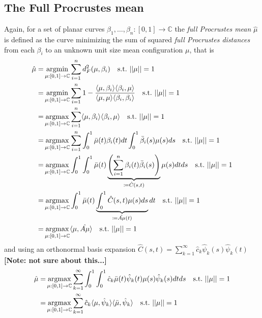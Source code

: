 \subsection{The Full Procrustes mean}
Again, for a set of planar curves $\beta_1,\dots,\beta_n : [0,1] \rightarrow \mathbb{C}$ the \textit{full Procrustes mean} $\hat{\mu}$ is defined as the curve minimizing the sum of squared \textit{full Procrustes distances} from each $\beta_i$ to an unknown unit size mean configuration $\mu$, that is
\begin{align*}
  \hat{\mu} =& \operatorname*{argmin}_{\mu:[0,1]\rightarrow\mathbb{C}} \sum_{i=1}^n d^2_F(\mu,\beta_i) 
    \quad\text{s.t.}\,\, ||\mu|| = 1 \\
  =& \operatorname*{argmin}_{\mu:[0,1]\rightarrow\mathbb{C}} \sum_{i=1}^n 1 - \frac{\langle \mu, \beta_i \rangle \langle \beta_i, \mu \rangle}{\langle \mu, \mu \rangle \langle \beta_i, \beta_i \rangle}
    \quad\text{s.t.}\,\, ||\mu|| = 1 \\
  =& \operatorname*{argmax}_{\mu:[0,1]\rightarrow\mathbb{C}} \sum_{i=1}^n \langle \mu, \beta_i \rangle \langle \beta_i, \mu \rangle
    \quad\text{s.t.}\,\, ||\mu|| = 1 \\
  =& \operatorname*{argmax}_{\mu:[0,1]\rightarrow\mathbb{C}} \sum_{i=1}^n 
    \int_0^1 \bar\mu(t) \beta_i(t) dt \int_0^1 \bar\beta_i(s) \mu(s) ds
    \quad\text{s.t.}\,\, ||\mu|| = 1 \\
  =& \operatorname*{argmax}_{\mu:[0,1]\rightarrow\mathbb{C}}  \int_0^1 \int_0^1 
    \bar\mu(t) \underbrace{\left( \sum_{i=1}^n \beta_i(t) \bar\beta_i(s) \right)}_{\coloneqq \hat{C}(s,t)} \mu(s) dt ds
    \quad\text{s.t.}\,\, ||\mu|| = 1 \\
  =& \operatorname*{argmax}_{\mu:[0,1]\rightarrow\mathbb{C}} \int_0^1 \bar\mu(t)
  \underbrace{\int_0^1 \hat{C}(s,t) \mu(s) ds}_{\coloneqq \hat{A\mu}(t)} dt
    \quad\text{s.t.}\,\, ||\mu|| = 1 \\
  =& \operatorname*{argmax}_{\mu:[0,1]\rightarrow\mathbb{C}}
    \langle \mu, \hat{A\mu} \rangle
    \quad\text{s.t.}\,\, ||\mu|| = 1 \\
\end{align*}
and using an orthonormal basis expansion $\hat{C}(s,t) = \sum_{k=1}^\infty \hat{c}_k \hat{\psi}_k(s) \hat{\psi}_k(t)$ \textbf{[Note: not sure about this...]}
\begin{align*}
  \hat{\mu}=& \operatorname*{argmax}_{\mu:[0,1]\rightarrow\mathbb{C}}  \sum_{k=1}^\infty \int_0^1 \int_0^1 
    \hat{c}_k \bar\mu(t) \hat\psi_k(t) \mu(s) \hat\psi_k(s) dt ds
    \quad\text{s.t.}\,\, ||\mu|| = 1 \\
  =& \operatorname*{argmax}_{\mu:[0,1]\rightarrow\mathbb{C}}  \sum_{k=1}^\infty  
    \hat{c}_k \langle\mu, \hat\psi_k \rangle \langle \bar\mu, \hat\psi_k \rangle
    \quad\text{s.t.}\,\, ||\mu|| = 1 
\end{align*}


